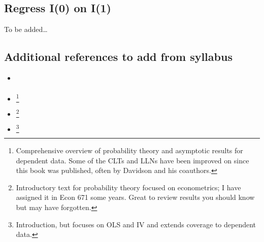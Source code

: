 \subsection{Regress I(0) on I(1)}
To be added\ldots

\subsection{Additional references to add from syllabus}
\begin{itemize}
\item \citet{Wa94}
\item \citet{Da94}%
\footnote{Comprehensive overview of probability theory and asymptotic
  results for dependent data. Some of the CLTs and LLNs have been improved
  on since this book was published, often by Davidson and his coauthors.} %
\item \citet{Ga97}%
\footnote{Introductory text for probability theory focused on econometrics;
  I have assigned it in Econ 671 some years. Great to review results you
  should know but may have forgotten.} %
\item \citet{Wh01}%
\footnote{Introduction, but focuses on OLS and IV and extends coverage
  to dependent data.} %
\end{itemize}

